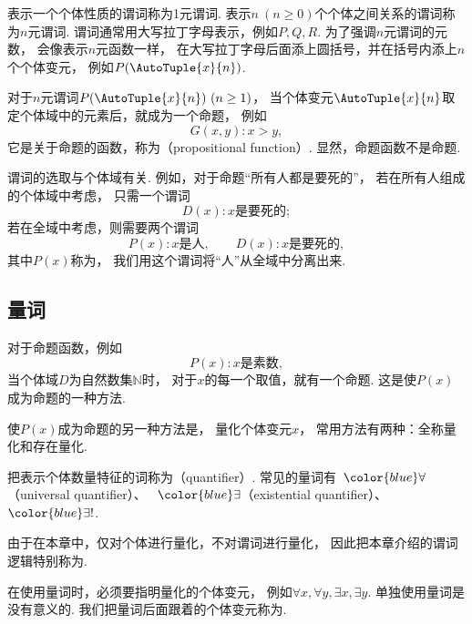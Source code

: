 表示一个个体性质的谓词称为1元谓词.
表示\(n\ (n\geq0)\)个个体之间关系的谓词称为\(n\)元谓词.
谓词通常用大写拉丁字母表示，例如\(P,Q,R\).
为了强调\(n\)元谓词的元数，
会像表示\(n\)元函数一样，
在大写拉丁字母后面添上圆括号，并在括号内添上\(n\)个个体变元，
例如\(P(\AutoTuple{x}{n})\).

对于\(n\)元谓词\(P(\AutoTuple{x}{n})\ (n\geq1)\)，
当个体变元\(\AutoTuple{x}{n}\)取定个体域中的元素后，就成为一个命题，
例如\begin{equation*}
	G(x,y):
	x>y,
\end{equation*}
它是关于命题的函数，称为（propositional function）.
显然，命题函数不是命题.

\begin{remark}
谓词的选取与个体域有关.
例如，对于命题“所有人都是要死的”，
若在所有人组成的个体域中考虑，
只需一个谓词\begin{equation*}
	D(x):
	\text{$x$是要死的};
\end{equation*}
若在全域中考虑，则需要两个谓词\begin{equation*}
	P(x):
	\text{$x$是人},
	\qquad
	D(x):
	\text{$x$是要死的},
\end{equation*}
其中\(P(x)\)称为，
我们用这个谓词将“人”从全域中分离出来.
\end{remark}

\subsection{量词}
对于命题函数，例如\begin{equation*}
	P(x):
	\text{$x$是素数},
\end{equation*}
当个体域\(D\)为自然数集\(\mathbb{N}\)时，
对于\(x\)的每一个取值，就有一个命题.
这是使\(P(x)\)成为命题的一种方法.

使\(P(x)\)成为命题的另一种方法是，
量化个体变元\(x\)，
常用方法有两种：全称量化和存在量化.

把表示个体数量特征的词称为（quantifier）.
常见的量词有~\(\color{blue}\forall\)（universal quantifier）、
~\(\color{blue}\exists\)（existential quantifier）、
~\(\color{blue}\exists!\).

由于在本章中，仅对个体进行量化，不对谓词进行量化，
因此把本章介绍的谓词逻辑特别称为.

在使用量词时，必须要指明量化的个体变元，
例如\(\forall x,\forall y,\exists x,\exists y\).
单独使用量词是没有意义的.
我们把量词后面跟着的个体变元称为.

